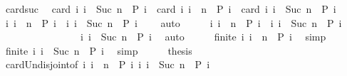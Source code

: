 \begin{isabellebody}
\ card{\isacharunderscore}suc{\isacharcolon}\isanewline
\ \ {\isacartoucheopen}card\ {\isacharbraceleft}i{\isachardot}\ i\ {\isasymle}\ {\isacharparenleft}Suc\ n{\isacharparenright}\ {\isasymand}\ P\ i{\isacharbraceright}\ {\isacharequal}\ card\ {\isacharbraceleft}i{\isachardot}\ i\ {\isasymle}\ n\ {\isasymand}\ P\ i{\isacharbraceright}\ {\isacharplus}\ card\ {\isacharbraceleft}i{\isachardot}\ i\ {\isacharequal}\ {\isacharparenleft}Suc\ n{\isacharparenright}\ {\isasymand}\ P\ i{\isacharbraceright}{\isacartoucheclose}\isanewline
%
\isadelimproof
%
\endisadelimproof
%
\isatagproof
{}\isamarkupfalse%
\ {\isacharminus}\isanewline
\ \ \isamarkupfalse%
\ {\isacartoucheopen}{\isacharbraceleft}i{\isachardot}\ i\ {\isasymle}\ n\ {\isasymand}\ P\ i{\isacharbraceright}\ {\isasyminter}\ {\isacharbraceleft}i{\isachardot}\ i\ {\isacharequal}\ {\isacharparenleft}Suc\ n{\isacharparenright}\ {\isasymand}\ P\ i{\isacharbraceright}\ {\isacharequal}\ {\isacharbraceleft}{\isacharbraceright}{\isacartoucheclose}\ \isamarkupfalse%
\ auto\isanewline
\ \ \isamarkupfalse%
\ \isamarkupfalse%
\ {\isacartoucheopen}{\isacharbraceleft}i{\isachardot}\ i\ {\isasymle}\ n\ {\isasymand}\ P\ i{\isacharbraceright}\ {\isasymunion}\ {\isacharbraceleft}i{\isachardot}\ i\ {\isacharequal}\ {\isacharparenleft}Suc\ n{\isacharparenright}\ {\isasymand}\ P\ i{\isacharbraceright}\isanewline
\ \ \ \ \ \ \ \ \ \ \ \ \ \ \ {\isacharequal}\ {\isacharbraceleft}i{\isachardot}\ i\ {\isasymle}\ {\isacharparenleft}Suc\ n{\isacharparenright}\ {\isasymand}\ P\ i{\isacharbraceright}{\isacartoucheclose}\ \isamarkupfalse%
\ auto\isanewline
\ \ \isamarkupfalse%
\ \isamarkupfalse%
\ {\isacartoucheopen}finite\ {\isacharbraceleft}i{\isachardot}\ i\ {\isasymle}\ n\ {\isasymand}\ P\ i{\isacharbraceright}{\isacartoucheclose}\ \isamarkupfalse%
\ simp\isanewline
\ \ \isamarkupfalse%
\ \isamarkupfalse%
\ {\isacartoucheopen}finite\ {\isacharbraceleft}i{\isachardot}\ i\ {\isacharequal}\ {\isacharparenleft}Suc\ n{\isacharparenright}\ {\isasymand}\ P\ i{\isacharbraceright}{\isacartoucheclose}\ \isamarkupfalse%
\ simp\isanewline
\ \ \isamarkupfalse%
\ \isamarkupfalse%
\ {\isacharquery}thesis\isanewline
\ \ \ \ \isamarkupfalse%
\ card{\isacharunderscore}Un{\isacharunderscore}disjoint{\isacharbrackleft}of\ {\isacartoucheopen}{\isacharbraceleft}i{\isachardot}\ i\ {\isasymle}\ n\ {\isasymand}\ P\ i{\isacharbraceright}{\isacartoucheclose}\ {\isacartoucheopen}{\isacharbraceleft}i{\isachardot}\ i\ {\isacharequal}\ Suc\ n\ {\isasymand}\ P\ i{\isacharbraceright}{\isacartoucheclose}{\isacharbrackright}\ \isamarkupfalse%

\end{isabellebody}
